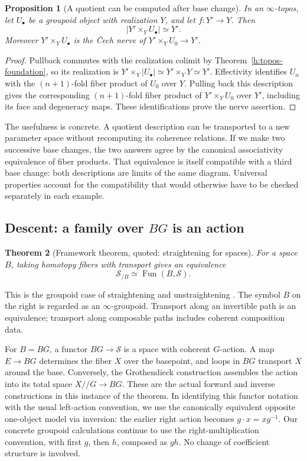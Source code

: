 \documentclass[11pt]{article}
\newtheorem{theorem}{Theorem}[section]
\newtheorem{proposition}[theorem]{Proposition}
\theoremstyle{definition}
\theoremstyle{remark}\newtheorem{remark}[theorem]{Remark}
\begin{document}
\begin{proposition}[A quotient can be computed after base change]
\label{h:quotient-basechange}
In an $\infty$-topos, let $U_\bullet$ be a groupoid object with realization $Y$, and let
$f:Y'\to Y$.  Then
\[
 \left|Y'\times_Y U_\bullet\right|\simeq Y'.
\]
Moreover $Y'\times_Y U_\bullet$ is the \v{C}ech nerve of
$Y'\times_Y U_0\to Y'$.
\end{proposition}
\begin{proof}
Pullback commutes with the realization colimit by
Theorem~\ref{h:topos-foundation}, so its realization is
$Y'\times_Y|U_\bullet|\simeq Y'\times_Y Y\simeq Y'$.
Effectivity identifies $U_n$ with the $(n+1)$-fold fiber product of $U_0$
over $Y$.  Pulling back this description gives the corresponding
$(n+1)$-fold fiber product of $Y'\times_Y U_0$ over $Y'$, including its
face and degeneracy maps.  These identifications prove the nerve assertion.
\end{proof}

The usefulness is concrete.  A quotient description can be transported to
a new parameter space without recomputing its coherence relations.  If we
make two successive base changes, the two answers agree by the canonical
associativity equivalence of fiber products.  That equivalence is itself
compatible with a third base change: both descriptions are limits of the
same diagram.  Universal properties account for the compatibility that
would otherwise have to be checked separately in each example.

\subsection{Descent: a family over \texorpdfstring{$BG$}{BG} is an action}

\begin{theorem}[Framework theorem, quoted: straightening for spaces]
\label{h:straightening}
For a space $B$, taking homotopy fibers with transport gives an equivalence
\[
 \mathcal S_{/B}\simeq\operatorname{Fun}(B,\mathcal S).
\]
\end{theorem}
This is the groupoid case of straightening and unstraightening
\cite[\S\S2.2,3.2]{HTT}.  The symbol $B$ on the right is regarded as
an $\infty$-groupoid.  Transport along an invertible path is an equivalence;
transport along composable paths includes coherent composition data.

For $B=BG$, a functor $BG\to\mathcal S$ is a space with coherent
$G$-action.  A map $E\to BG$ determines the fiber $X$ over the basepoint,
and loops in $BG$ transport $X$ around the base.  Conversely, the
Grothendieck construction assembles the action into its total space
$X/\!/G\to BG$.  These are the actual forward and inverse constructions
in this instance of the theorem.  In identifying this functor notation
with the usual left-action convention, we use the canonically equivalent
opposite one-object model via inversion: the earlier right action becomes
$g\cdot x=xg^{-1}$.  Our concrete groupoid calculations continue to use
the right-multiplication convention, with first $g$, then $h$, composed
as $gh$.  No change of coefficient structure is involved.
\end{document}
